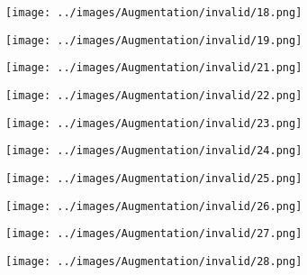 \begin{figure}[H]
\begin{subfigure}[b]{0.1\textwidth}
 \centering
 \texttt{[image: ../images/Augmentation/invalid/18.png]}
\end{subfigure}
\hspace{1em}%
\begin{subfigure}[b]{0.1\textwidth}
 \centering
 \texttt{[image: ../images/Augmentation/invalid/19.png]}
\end{subfigure}
\hspace{1em}%
\begin{subfigure}[b]{0.1\textwidth}
\centering
\texttt{[image: ../images/Augmentation/invalid/21.png]}
\end{subfigure}
\hspace{1em}%
\begin{subfigure}[b]{0.1\textwidth}
 \centering
 \texttt{[image: ../images/Augmentation/invalid/22.png]}
\end{subfigure}
\hspace{1em}%
\begin{subfigure}[b]{0.1\textwidth}
 \centering
 \texttt{[image: ../images/Augmentation/invalid/23.png]}
\end{subfigure}
\hspace{1em}%
\begin{subfigure}[b]{0.1\textwidth}
 \centering
 \texttt{[image: ../images/Augmentation/invalid/24.png]}
\end{subfigure}
\hspace{1em}%
\begin{subfigure}[b]{0.1\textwidth}
\centering
\texttt{[image: ../images/Augmentation/invalid/25.png]}
\end{subfigure}
\hspace{1em}%
\begin{subfigure}[b]{0.1\textwidth}
 \centering
 \texttt{[image: ../images/Augmentation/invalid/26.png]}
\end{subfigure}
\hspace{1em}%
\begin{subfigure}[b]{0.1\textwidth}
 \centering
 \texttt{[image: ../images/Augmentation/invalid/27.png]}
\end{subfigure}
\hspace{1em}%
\begin{subfigure}[b]{0.1\textwidth}
 \centering
 \texttt{[image: ../images/Augmentation/invalid/28.png]}
\end{subfigure}

\end{figure}
